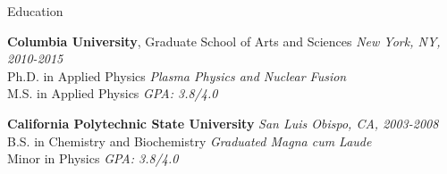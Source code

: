 \documentclass{resume} %
\begin{document}

%
%


\begin{rSection}{Education}

{\bf Columbia University}, Graduate School of Arts and Sciences \hfill {\em New York, NY, 2010-2015} \\ 
Ph.D. in Applied Physics \hfill {\em  Plasma Physics and Nuclear Fusion} \\
M.S. in Applied Physics \hfill {\em GPA: 3.8/4.0} \smallskip 

{\bf California Polytechnic State University } \hfill {\em San Luis Obispo, CA, 2003-2008} \\ 
B.S. in Chemistry and Biochemistry \hfill {\em Graduated Magna cum Laude} \\
Minor in Physics \hfill {\em GPA: 3.8/4.0} \smallskip



\end{rSection}

\end{document}
